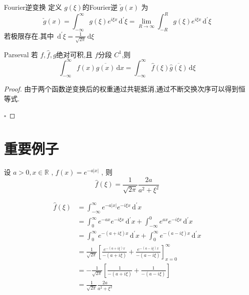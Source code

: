 \documentclass[../../main.tex]{subfiles}
\begin{document}
\begin{definition}{Fourier逆变换}
    定义 \(  g\left(  \xi  \right)   \)的Fourier逆 \( \check{g}\left( x \right)    \)  为 \[
    \check{g}\left( x \right)= \int_{-\infty}^{\infty}g\left(  \xi  \right)e^{i \xi x}\,\mathrm{d} ^{\prime}  \xi = \lim_{R\to \infty}\int_{-R}^{R}g\left(  \xi  \right)e^{i \xi x}\,\mathrm{d} ^{\prime}  \xi    
    \]若极限存在.其中 \(  \,\mathrm{d} ^{\prime}  \xi   = \frac{1 }{\sqrt{2\pi } }\,\mathrm{d}  \xi  \) 
\end{definition}


\begin{theorem}{Parseval}
    若 \(  f,\hat{f},g  \)绝对可积,且 \(  f  \)分段 \(  C^{1}  \),则    \[
    \int_{-\infty}^{\infty}f\left( x \right) \overline{g\left( x \right) }\,\mathrm{d} x =  \int_{-\infty}^{\infty} \hat{f}\left(  \xi  \right)  \overline{\hat{g}\left(  \xi  \right) }\,\mathrm{d}  \xi  
    \]
\end{theorem}
\begin{proof}
    由于两个函数逆变换后的权重通过共轭抵消,通过不断交换次序可以得到恒等式.

    \hfill $\square$
\end{proof}

\section{重要例子}

\begin{example}
    设 \(  a> 0, x\in \mathbb{R}   \) , \(  f\left( x \right)= e^{-a\left| x \right| }   \)  , 则\[
      \hat{f}\left(  \xi  \right)= \frac{1 }{\sqrt{2\pi } } \frac{2a }{a^{2}+  \xi ^{2} }   
    \]  
\end{example}
\begin{solution}
 \[
 \begin{aligned}
 \hat{f}\left(  \xi  \right)&= \int_{-\infty}^{\infty}e^{-a\left| x \right| }e^{-i \xi x}\,\mathrm{d}^{\prime}  x \\ 
  &=  \int_{0}^{\infty}e^{-ax}e^{-i \xi x}\,\mathrm{d} ^{\prime} x +  \int_{-\infty}^{0} e^{ax}e^{-i \xi x}\,\mathrm{d} ^{\prime} x\\ 
   &= \int_{0}^{\infty}e^{-\left( a+ i \xi  \right)x }\,\mathrm{d} ^{\prime} x+  \int_{0}^{\infty}e^{-\left( a-i \xi  \right)x }\,\mathrm{d} ^{\prime} x\\ 
    &= \frac{1 }{\sqrt{2\pi }  }\left[ \frac{e^{-\left( a+ i \xi  \right)x } }{-\left( a+ i \xi  \right)  } +  \frac{e^{-\left( a-i \xi  \right)x } }{-\left( a-i \xi \right)  }   \right]_{x= 0}^{\infty}\\ 
     &= -\frac{1 }{\sqrt{2\pi } }\left[ \frac{1 }{-\left( a+ i \xi  \right)  }+ \frac{1 }{-\left( a-i \xi  \right)  }    \right]\\ 
      &= \frac{1 }{\sqrt{2\pi } }\frac{2a }{a^{2}+  \xi ^{2} }      
 \end{aligned}
 \]
\end{solution}
\end{document}
